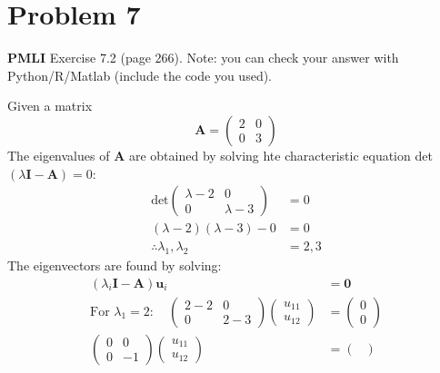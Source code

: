 \documentclass[11pt,twoside]{article}
\newcommand{\?}{\stackrel{?}{=}}
\newcommand{\bl}{\color{blue}}
\newcommand{\la}{\lambda}
\newenvironment{solution}{\begin{adjustwidth}{.05\textwidth}{}\bl}{\medskip\end{adjustwidth}}
\begin{document}
\section*{Problem 7 }
\textbf{PMLI} Exercise 7.2 (page 266). Note: you can check your answer with Python/R/Matlab (include the code you used).
\begin{solution}
  Given a matrix
  \begin{equation*}
    \bm A =
    \begin{pmatrix}
      2 & 0 \\ 0 & 3
    \end{pmatrix}
  \end{equation*}
  The eigenvalues of $\bm A$ are obtained by solving hte characteristic equation det$(\la\bm I - \bm A) = 0$:
  \begin{align*}
    \text{det}
    \begin{pmatrix}
      \la -2 & 0 \\ 0 & \la -3 
    \end{pmatrix} & =  0 \\
    (\la -2)(\la - 3) - 0 &= 0 \\
    \therefore \la_1, \la_2 &= 2, 3
  \end{align*}
  The eigenvectors are found by solving:
  \begin{align*}
    (\la_{i}\bm I - \bm A)\bm u_{i} &= \bm 0 \\
    \text{For } \la_{1} = 2: \quad
    \begin{pmatrix}
      2 - 2 & 0 \\ 0 & 2 - 3 
    \end{pmatrix}
                       \begin{pmatrix}
                         u_{11} \\ u_{12}
                       \end{pmatrix} &=
    \begin{pmatrix}
      0 \\ 0
    \end{pmatrix} \\
    \begin{pmatrix}
      0 & 0 \\ 0 & -1 
    \end{pmatrix}
                        \begin{pmatrix}
                         u_{11} \\ u_{12}
                       \end{pmatrix} &=
                                       \begin{pmatrix}

\end{pmatrix}
\end{align*}
\end{solution}
\end{document}
